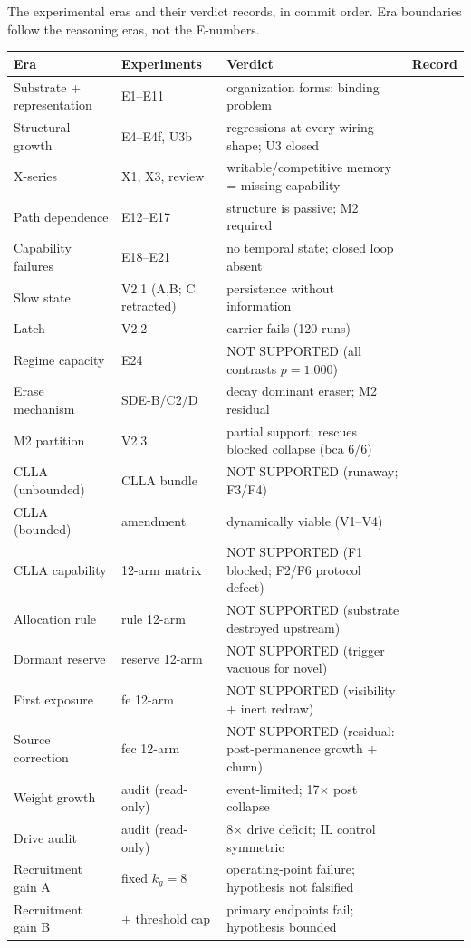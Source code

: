 The experimental eras and their verdict records, in commit order.
Era boundaries follow the reasoning eras, not the E-numbers.

\begin{center}
\small
\begin{tabular}{p{3.9cm}p{3.2cm}p{4.0cm}p{3.6cm}}
\toprule
Era & Experiments & Verdict & Record \\
\midrule
Substrate + representation & E1--E11 & organization forms; binding problem & \cite{e1proto,e3bproto,overview} \\
Structural growth & E4--E4f, U3b & regressions at every wiring shape; U3 closed & \cite{e4proto} \\
X-series & X1, X3, review & writable/competitive memory = missing capability & \cite{xplor2} \\
Path dependence & E12--E17 & structure is passive; M2 required & \cite{synmem} \\
Capability failures & E18--E21 & no temporal state; closed loop absent & \cite{overview} \\
Slow state & V2.1 (A,B; C retracted) & persistence without information & \cite{infoaudit} \\
Latch & V2.2 & carrier fails (120 runs) & \cite{overview} \\
Regime capacity & E24 & NOT SUPPORTED (all contrasts \(p=1.000\)) & \cite{e24proto} \\
Erase mechanism & SDE-B/C2/D & decay dominant eraser; M2 residual & \cite{overview} \\
M2 partition & V2.3 & partial support; rescues blocked collapse (bca 6/6) & \cite{overview} \\
CLLA (unbounded) & CLLA bundle & NOT SUPPORTED (runaway; F3/F4) & \cite{cllarecord} \\
CLLA (bounded) & amendment & dynamically viable (V1--V4) & \cite{bbounded} \\
CLLA capability & 12-arm matrix & NOT SUPPORTED (F1 blocked; F2/F6 protocol defect) & \cite{capability} \\
Allocation rule & rule 12-arm & NOT SUPPORTED (substrate destroyed upstream) & \cite{rule} \\
Dormant reserve & reserve 12-arm & NOT SUPPORTED (trigger vacuous for novel) & \cite{reserve} \\
First exposure & fe 12-arm & NOT SUPPORTED (visibility + inert redraw) & \cite{fe} \\
Source correction & fec 12-arm & NOT SUPPORTED (residual: post-permanence growth + churn) & \cite{fec} \\
Weight growth & audit (read-only) & event-limited; 17\(\times\) post collapse & \cite{wgrowth} \\
Drive audit & audit (read-only) & 8\(\times\) drive deficit; IL control symmetric & \cite{drive} \\
Recruitment gain A & fixed \(k_g=8\) & operating-point failure; hypothesis not falsified & \cite{rg8} \\
Recruitment gain B & \(+\) threshold cap & primary endpoints fail; hypothesis bounded & \cite{rg8c} \\
\bottomrule
\end{tabular}
\end{center}

